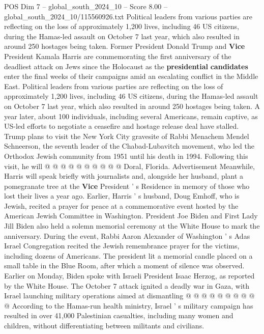 \begin{textsample}{POS Dim 7 – global\_south\_2024\_10 – Score 8.00 – global\_south\_2024\_10/115560926.txt}  \label{ex:f7_pos_223}
Political leaders from various parties are reflecting on the loss of approximately 1,200 lives, including 46 US citizens, during the Hamas-led assault on October 7 last year, which also resulted in around 250 hostages being taken.
Former President Donald Trump and \textbf{Vice} President Kamala Harris are commemorating the first anniversary of the deadliest attack on Jews since the Holocaust as the \textbf{presidential} \textbf{candidates} enter the final weeks of their campaigns amid an escalating conflict in the Middle East.
Political leaders from various parties are reflecting on the loss of approximately 1,200 lives, including 46 US citizens, during the Hamas-led assault on October 7 last year, which also resulted in around 250 hostages being taken.
A year later, about 100 individuals, including several Americans, remain captive, as US-led efforts to negotiate a ceasefire and hostage release deal have stalled.
Trump plans to visit the New York City gravesite of Rabbi Menachem Mendel Schneerson, the seventh leader of the Chabad-Lubavitch movement, who led the Orthodox Jewish community from 1951 until his death in 1994.
Following this visit, he will @ @ @ @ @ @ @ @ @ @ Doral, Florida.
Advertisement Meanwhile, Harris will speak briefly with journalists and, alongside her husband, plant a pomegranate tree at the \textbf{Vice} President ' s Residence in memory of those who lost their lives a year ago.
Earlier, Harris ' s husband, Doug Emhoff, who is Jewish, recited a prayer for peace at a commemorative event hosted by the American Jewish Committee in Washington.
President Joe Biden and First Lady Jill Biden also held a solemn memorial ceremony at the White House to mark the anniversary.
During the event, Rabbi Aaron Alexander of Washington ' s Adas Israel Congregation recited the Jewish remembrance prayer for the victims, including dozens of Americans.
The president lit a memorial candle placed on a small table in the Blue Room, after which a moment of silence was observed.
Earlier on Monday, Biden spoke with Israeli President Isaac Herzog, as reported by the White House.
The October 7 attack ignited a deadly war in Gaza, with Israel launching military operations aimed at dismantling @ @ @ @ @ @ @ @ @ @ According to the Hamas-run health ministry, Israel ' s military campaign has resulted in over 41,000 Palestinian casualties, including many women and children, without differentiating between militants and civilians.

\end{textsample}
